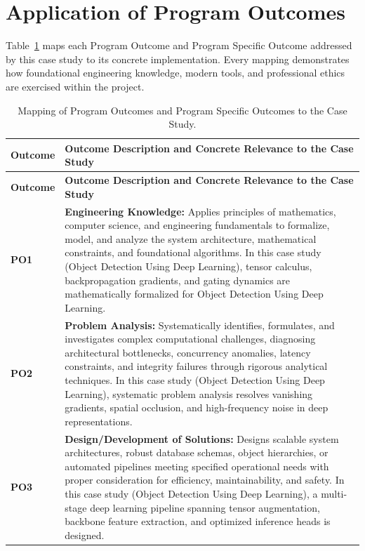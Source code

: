 \section{Application of Program Outcomes}
Table~\ref{tab:po} maps each Program Outcome and Program Specific Outcome addressed by this case study to its concrete implementation. Every mapping demonstrates how foundational engineering knowledge, modern tools, and professional ethics are exercised within the project.

{\small
\begin{longtable}{@{}>{\centering\arraybackslash}p{1.8cm} p{13.2cm}@{}}
    \caption{Mapping of Program Outcomes and Program Specific Outcomes to the Case Study.}\label{tab:po}\\
    \toprule
    \textbf{Outcome} & \textbf{Outcome Description and Concrete Relevance to the Case Study} \\
    \midrule
    \endfirsthead
    \toprule
    \textbf{Outcome} & \textbf{Outcome Description and Concrete Relevance to the Case Study} \\
    \midrule
    \endhead
\textbf{PO1} & \textbf{Engineering Knowledge:} Applies principles of mathematics, computer science, and engineering fundamentals to formalize, model, and analyze the system architecture, mathematical constraints, and foundational algorithms. In this case study (Object Detection Using Deep Learning), tensor calculus, backpropagation gradients, and gating dynamics are mathematically formalized for Object Detection Using Deep Learning. \\
    \addlinespace
\textbf{PO2} & \textbf{Problem Analysis:} Systematically identifies, formulates, and investigates complex computational challenges, diagnosing architectural bottlenecks, concurrency anomalies, latency constraints, and integrity failures through rigorous analytical techniques. In this case study (Object Detection Using Deep Learning), systematic problem analysis resolves vanishing gradients, spatial occlusion, and high-frequency noise in deep representations. \\
    \addlinespace
\textbf{PO3} & \textbf{Design/Development of Solutions:} Designs scalable system architectures, robust database schemas, object hierarchies, or automated pipelines meeting specified operational needs with proper consideration for efficiency, maintainability, and safety. In this case study (Object Detection Using Deep Learning), a multi-stage deep learning pipeline spanning tensor augmentation, backbone feature extraction, and optimized inference heads is designed. \\

\end{longtable}}
